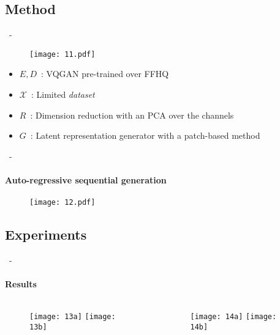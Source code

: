 \documentclass[aspectratio=169, 22pt]{beamer}
\begin{document}
\subsection{Method}
\begin{frame}{\secname~- \subsecname}
  \begin{figure}
    \texttt{[image: 11.pdf]}
  \end{figure}
  \begin{itemize}
  \item $E, D$ : VQGAN pre-trained over FFHQ
  \item $\mathcal{X}$ : Limited \emph{dataset}
  \item $R$ : Dimension reduction with an PCA over the channels
  \item $G$ : \alert{Latent representation generator with a patch-based method}
  \end{itemize}
\end{frame}

\begin{frame}{\secname~- \subsecname}
  \framesubtitle{Auto-regressive sequential generation}
  \begin{figure}
    \texttt{[image: 12.pdf]}
  \end{figure}
\end{frame}

\subsection{Experiments}
\begin{frame}{\secname~- \subsecname}
  \framesubtitle{Results}
  \begin{columns}
    \begin{column}{0.5\linewidth}
      \begin{figure}
        \texttt{[image: 13a]}
        \texttt{[image: 13b]}
      \end{figure}
    \end{column}
    \begin{column}{0.5\linewidth}
      \begin{figure}
        \texttt{[image: 14a]}
        \texttt{[image: 14b]}
      \end{figure}
    \end{column}
  \end{columns}
\end{frame}
\end{document}
